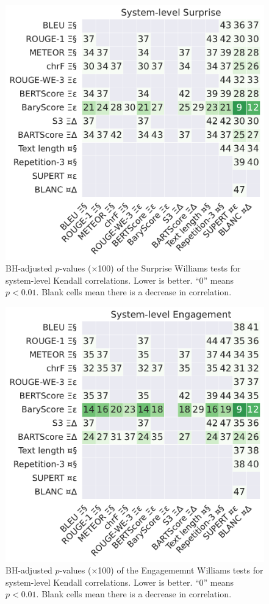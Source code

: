 \begin{figure}[h]
    \centering
    \includegraphics[width=0.62\columnwidth]{pictures/williams_system_kendall_Surprise.pdf}
    \caption{BH-adjusted $p$-values ($\times$100) of the Surprise Williams tests for system-level Kendall correlations. Lower is better. ``0'' means $p<0.01$. Blank cells mean there is a decrease in correlation.}
    \label{fig:williams_system_surprise}
\end{figure}

\begin{figure}[h]
    \centering
    \includegraphics[width=0.62\columnwidth]{pictures/williams_system_kendall_Engagement.pdf}
    \caption{BH-adjusted $p$-values ($\times$100) of the Engagememnt Williams tests for system-level Kendall correlations. Lower is better. ``0'' means $p<0.01$. Blank cells mean there is a decrease in correlation.}
    \label{fig:williams_system_engagement}
\end{figure}


